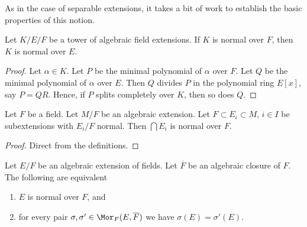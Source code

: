 \noindent
As in the case of separable extensions, it takes a bit of work to establish
the basic properties of this notion.

\begin{lemma}
\label{lemma-normal-goes-up}
Let $K/E/F$ be a tower of algebraic field extensions.
If $K$ is normal over $F$, then $K$ is normal over $E$.
\end{lemma}

\begin{proof}
Let $\alpha \in K$. Let $P$ be the minimal polynomial of $\alpha$ over $F$.
Let $Q$ be the minimal polynomial of $\alpha$ over $E$.
Then $Q$ divides $P$ in the polynomial ring $E[x]$, say $P = QR$.
Hence, if $P$ splits completely over $K$, then so does $Q$.
\end{proof}

\begin{lemma}
\label{lemma-intersect-normal}
Let $F$ be a field. Let $M/F$ be an algebraic extension. Let
$F \subset E_i \subset M$, $i \in I$ be subextensions with
$E_i/F$ normal. Then $\bigcap E_i$ is normal over $F$.
\end{lemma}

\begin{proof}
Direct from the definitions.
\end{proof}

\begin{lemma}
\label{lemma-characterize-normal}
Let $E/F$ be an algebraic extension of fields. Let $\overline{F}$ be an
algebraic closure of $F$. The following are equivalent
\begin{enumerate}
\item $E$ is normal over $F$, and
\item for every pair $\sigma, \sigma' \in \Mor_F(E, \overline{F})$ we
have $\sigma(E) = \sigma'(E)$.
\end{enumerate}
\end{lemma}

